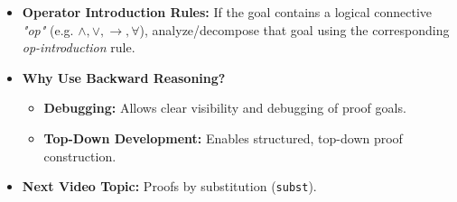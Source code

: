 \documentclass[10pt,a4paper]{article}
\begin{document}
\vspace{0.3em}

\begin{tcolorbox}[title={3. Connectives, Advantages \& Next Topics}]
\begin{itemize}[leftmargin=1.2em, itemsep=3pt]
    \item \textbf{Operator Introduction Rules:} If the goal contains a logical connective \textit{"op"} (e.g. $\land, \lor, \rightarrow, \forall$), analyze/decompose that goal using the corresponding \textit{op-introduction} rule.
    \item \textbf{Why Use Backward Reasoning?}
    \begin{itemize}[leftmargin=1em, label=$\bullet$]
        \item \textbf{Debugging:} Allows clear visibility and debugging of proof goals.
        \item \textbf{Top-Down Development:} Enables structured, top-down proof construction.
    \end{itemize}
    \item \textbf{Next Video Topic:} Proofs by substitution (\texttt{subst}).
\end{itemize}
\end{tcolorbox}
\end{document}
